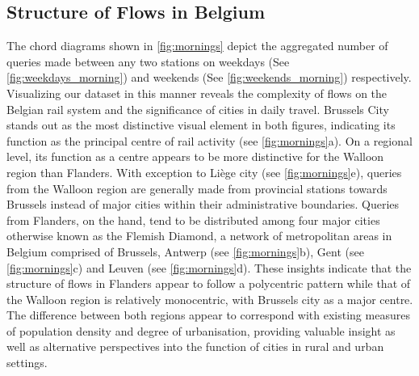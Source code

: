 \documentclass{sig-alternate}
\begin{document}
\subsection{Structure of Flows in Belgium}

The chord diagrams shown in \cref{fig:mornings} depict the aggregated number of queries made between any two stations on weekdays (See \cref{fig:weekdays_morning}) and weekends (See \cref{fig:weekends_morning}) respectively. 
Visualizing our dataset in this manner reveals the complexity of flows on the Belgian rail system and the significance of cities in daily travel.
Brussels City stands out as the most distinctive visual element in both figures, indicating its function as the principal centre of rail activity (see \cref{fig:mornings}a).
On a regional level, its function as a centre appears to be more distinctive for the Walloon region than Flanders.
With exception to Liège city (see \cref{fig:mornings}e), queries from the Walloon region are generally made from provincial stations towards Brussels instead of major cities within their administrative boundaries. 
Queries from Flanders, on the hand, tend to be distributed among four major cities otherwise known as the Flemish Diamond, a network of metropolitan areas in Belgium comprised of Brussels, Antwerp (see \cref{fig:mornings}b), Gent (see \cref{fig:mornings}c) and Leuven (see \cref{fig:mornings}d). 
These insights indicate that the structure of flows in Flanders appear to follow a polycentric pattern while that of the Walloon region is relatively monocentric, with Brussels city as a major centre.
The difference between both regions appear to correspond with existing measures of population density and degree of urbanisation, providing valuable insight as well as alternative perspectives into the function of cities in rural and urban settings.
\end{document}
